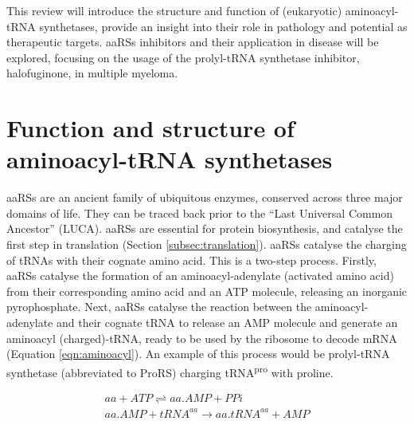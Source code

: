 This review will introduce the structure and function of (eukaryotic) aminoacyl-tRNA synthetases, provide an insight into their role in pathology and potential as therapeutic targets.
aaRSs inhibitors and their application in disease will be explored, focusing on the usage of the prolyl-tRNA synthetase inhibitor, halofuginone, in multiple myeloma.

\section{Function and structure of aminoacyl-tRNA synthetases}

aaRSs are an ancient family of ubiquitous enzymes, conserved across three major domains of life.
They can be traced back prior to the ``Last Universal Common Ancestor'' (LUCA)\cite{de2020evolution}.
aaRSs are essential for protein biosynthesis, and catalyse the first step in translation (Section \ref{subsec:translation}).
aaRSs catalyse the charging of tRNAs with their cognate amino acid.
This is a two-step process.
Firstly, aaRSs catalyse the formation of an aminoacyl-adenylate (activated amino acid) from their corresponding amino acid and an ATP molecule, releasing an inorganic pyrophosphate.
Next, aaRSs catalyse the reaction between the aminoacyl-adenylate and their cognate tRNA to release an AMP molecule and generate an aminoacyl (charged)-tRNA, ready to be used by the ribosome to decode mRNA (Equation \ref{eqn:aminoacyl}).
An example of this process would be prolyl-tRNA synthetase (abbreviated to ProRS) charging tRNA\textsuperscript{pro} with proline.

\begin{equation}\label{eqn:aminoacyl}
\begin{gathered}
aa + ATP \rightleftharpoons  aa.AMP + PPi \\
aa.AMP + tRNA^{aa} \longrightarrow  aa.tRNA^{aa} + AMP
\end{gathered}
\end{equation}

